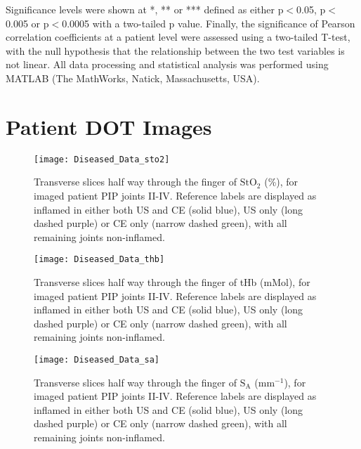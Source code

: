 \documentclass[twoside]{bhamthesis}
\theoremstyle{definition}
\begin{document}
Significance levels were shown at *, ** or *** defined as either p$<$0.05, p$<$0.005 or  p$<$0.0005 with a two-tailed p value. Finally, the significance of Pearson correlation coefficients at a patient level were assessed using a two-tailed T-test, with the null hypothesis that the relationship between the two test variables is not linear. All data processing and statistical analysis was performed using MATLAB (The MathWorks, Natick, Massachusetts, USA).



\section{Patient DOT Images}

\begin{figure}[!ht]
\centering\texttt{[image: Diseased\_Data\_sto2]}
\caption{Transverse slices half way through the finger of $\mathrm{StO_2}$ (\%), for imaged patient PIP joints II-IV. Reference labels are displayed as inflamed in either both US and CE (solid blue), US only (long dashed purple) or CE only (narrow dashed green), with all remaining joints non-inflamed.}
\label{fig:Diseased_Data_sto2}
\end{figure}

\begin{figure}[!ht]
\centering\texttt{[image: Diseased\_Data\_thb]}
\caption{Transverse slices half way through the finger of tHb (mMol), for imaged patient PIP joints II-IV. Reference labels are displayed as inflamed in either both US and CE (solid blue), US only (long dashed purple) or CE only (narrow dashed green), with all remaining joints non-inflamed.}
\label{fig:Diseased_Data_thb}
\end{figure}

\begin{figure}[!ht]
\centering\texttt{[image: Diseased\_Data\_sa]}
\caption{Transverse slices half way through the finger of $\mathrm{S_A}$ (mm$^{-1}$), for imaged patient PIP joints II-IV. Reference labels are displayed as inflamed in either both US and CE (solid blue), US only (long dashed purple) or CE only (narrow dashed green), with all remaining joints non-inflamed.}
\label{fig:Diseased_Data_sa}
\end{figure}
\end{document}
